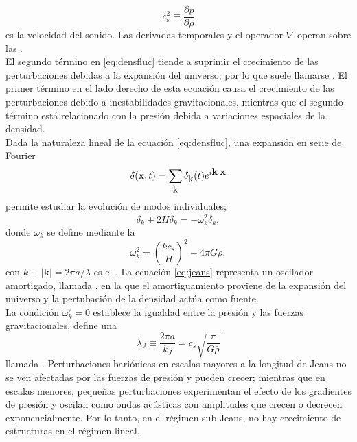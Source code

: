 \begin{equation}
c^2_{\mbox{s}}\equiv \frac{\partial p}{\partial \rho}
\end{equation}
es la velocidad del sonido. Las derivadas temporales y el operador $\nabla$ operan sobre las . \\

El segundo t\'ermino en \eqref{eq:densfluc} tiende a suprimir el crecimiento de las perturbaciones debidas a la expansi\'on del universo; por lo que suele llamarse . El primer t\'ermino en el lado derecho de esta ecuaci\'on causa el crecimiento de las perturbaciones debido a inestabilidades gravitacionales, mientras que el segundo t\'ermino est\'a relacionado con la presi\'on debida  a variaciones espaciales de la densidad. \\ 

Dada la naturaleza lineal de la ecuaci\'on \eqref{eq:densfluc}, una expansi\'on en serie de Fourier 
\begin{equation}
\delta (\mathbf{x},t)=\sum_{\mbox{k}} \delta_{\mbox{k}}(t) e^{i \mbox{\textbf{k}} \cdot  \mbox{\textbf{x}}}
\end{equation}
permite estudiar la evoluci\'on de modos individuales; 
\begin{equation}
\ddot{\delta_k}+2H\dot{\delta_k}=-\omega_k^2\delta_k,
\label{eq:jeans}
\end{equation}
donde $\omega_k$ se define mediante la 
\begin{equation}
\omega_k^2=\left(\frac{k c_s}{H} \right)^2-4\pi G \rho,
\end{equation}
con $k\equiv |\mathbf{k}|=2 \pi a/\lambda $ es el . La ecuaci\'on \eqref{eq:jeans} representa un oscilador amortigado, llamada , en la que el amortiguamiento proviene de la expansi\'on del universo y la pertubaci\'on de la densidad act\'ua como fuente. \\

La condici\'on $\omega_k^2=0$ establece la igualdad entre la presi\'on y las fuerzas gravitacionales, define una 
\begin{equation}
\lambda_J \equiv \frac{2 \pi a}{k_J}=c_s \sqrt{\frac{\pi}{G\bar{\rho}}}
\end{equation}
llamada . Perturbaciones bari\'onicas en escalas mayores a la longitud de Jeans no se ven afectadas por las fuerzas de presi\'on y pueden crecer; mientras que en escalas menores, pequeñas perturbaciones experimentan el efecto de los gradientes de presi\'on y oscilan como ondas ac\'usticas con amplitudes que crecen o decrecen exponencialmente. Por lo tanto, en el r\'egimen sub-Jeans, no hay crecimiento de estructuras en el r\'egimen lineal.